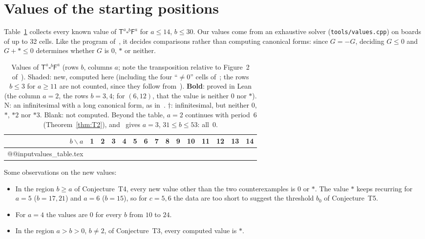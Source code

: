 \documentclass[11pt,a4paper]{article}
\newcommand{\Tt}{\mathsf{T}}
\newcommand{\Ff}{\mathsf{F}}
\newcommand{\E}{\square}
\theoremstyle{plain}
\theoremstyle{remark}
\begin{document}
\section{Values of the starting positions}\label{sec:values}

Table~\ref{tab:values} collects every known value of $\Tt^a\E^b\Ff^a$ for $a\le14$, $b\le30$.
Our values come from an exhaustive solver (\texttt{tools/values.cpp}) on boards of up to 32
cells. Like the program of~\cite{T11}, it decides comparisons rather than computing canonical
forms: since $G=-G$, deciding $G\le0$ and $G+\ast\le0$ determines whether $G$ is $0$, $\ast$ or
neither.

\begin{table}[htbp]
\centering
\small
\setlength{\tabcolsep}{4.2pt}
\renewcommand{\arraystretch}{1.08}
\begin{tabular}{@{}r|*{14}{c}@{}}
\toprule
$b\backslash a$ & 1 & 2 & 3 & 4 & 5 & 6 & 7 & 8 & 9 & 10 & 11 & 12 & 13 & 14 \\
\midrule
\csname @@input\endcsname values_table.tex
\bottomrule
\end{tabular}
\caption{Values of $\Tt^a\E^b\Ff^a$ (rows $b$, columns $a$; note the transposition relative to
Figure~2 of~\cite{T11}). \colorbox{orange!22}{Shaded}: new, computed here (including the four
``$\neq0$'' cells of~\cite{T11}; the rows $b\le3$ for $a\ge11$ are not counted, since they
follow from~\cite{T11,Th08}). \textbf{Bold}: proved in Lean (the column $a=2$, the rows $b=3,4$;
for $(6,12)$, that the value is neither $0$ nor $\ast$). $\mathrm{N}$: an infinitesimal with a long canonical form, as in~\cite{E96,T11}.
$\dagger$: infinitesimal, but neither $0$, $\ast$, $\ast2$ nor $\ast3$. Blank: not computed.
Beyond the table, $a=2$ continues with period~$6$ (Theorem~\ref{thm:T2}), and~\cite{T11} gives
$a=3$, $31\le b\le 53$: all~$0$.}
\label{tab:values}
\end{table}

Some observations on the new values:
\begin{itemize}
\item In the region $b\ge a$ of Conjecture~T4, every new value other than the two
  counterexamples is $0$ or $\ast$. The value $\ast$ keeps recurring for $a=5$ ($b=17,21$) and
  $a=6$ ($b=15$), so for $c=5,6$ the data are too short to suggest the threshold $b_0$ of
  Conjecture~T5.
\item For $a=4$ the values are $0$ for every $b$ from $10$ to $24$.
\item In the region $a>b>0$, $b\ne2$, of Conjecture~T3, every computed value is $\ast$.
\end{itemize}
\end{document}
